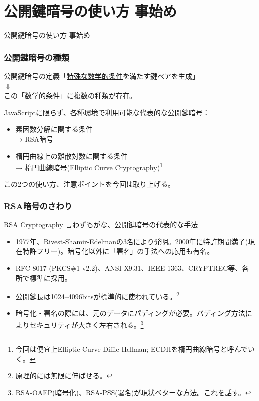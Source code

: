 \documentclass[12pt,dvipdfmx]{beamer}
\begin{document}
\section{公開鍵暗号の使い方 事始め}
\begin{frame}
\centering
{\Large 公開鍵暗号の使い方 事始め}
\end{frame}

\begin{frame}
\frametitle{公開鍵暗号の種類}
\begin{exampleblock}{}
\begin{center}
公開鍵暗号の定義「\underline{特殊な数学的条件}を満たす鍵ペアを生成」\\[0.5ex]
 $\Downarrow$\\[0.5ex]
この「数学的条件」に複数の種類が存在。
\end{center}
\end{exampleblock}

\vspace{2ex}

JavaScriptに限らず、各種環境で利用可能な代表的な公開鍵暗号：
\begin{itemize}
 \item 素因数分解に関する条件\\ → \alert{RSA暗号}
 \item 楕円曲線上の離散対数に関する条件\\ → \alert{楕円曲線暗号(Elliptic Curve Cryptography)}\footnote[frame]{\scriptsize 今回は便宜上Elliptic Curve Diffie-Hellman; ECDHを楕円曲線暗号と呼んでいく。}
\end{itemize}
この2つの使い方、注意ポイントを今回は取り上げる。
\end{frame}

\begin{frame}
\frametitle{RSA暗号のさわり}
\begin{block}{RSA Cryptography}
言わずもがな、公開鍵暗号の代表的な手法
\begin{itemize}
 \item 1977年、Rivest-Shamir-Edelmanの3名により発明。2000年に特許期間満了(現在特許フリー)。暗号化以外に「署名」の手法への応用も有名。
 \item RFC 8017 (PKCS\#1 v2.2)、ANSI X9.31、IEEE 1363、CRYPTREC等、各所で標準に採用。
 \item 公開鍵長は1024--4096bitsが標準的に使われている。\footnote[frame]{原理的には無限に伸ばせる。}
 \item 暗号化・署名の際には、元のデータにパディングが必要。\alert{パディング方法によりセキュリティが大きく左右される。}\footnote[frame]{RSA-OAEP(暗号化)、RSA-PSS(署名)が現状ベターな方法。これを話す。}
\end{itemize}
\end{block}

\end{frame}
\end{document}
